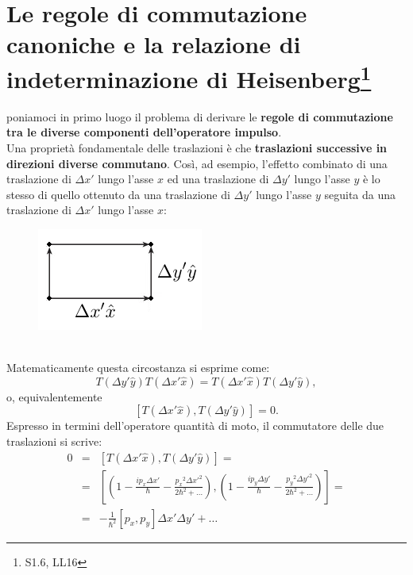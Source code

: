 \documentclass[a4paper,12pt,oneside]{book}
\begin{document}
\section[Le regole di commutazione canoniche e la relazione di indeterminazione di Heisenberg]{Le regole di commutazione canoniche e la relazione di indeterminazione di Heisenberg\footnote{S1.6, LL16}}
poniamoci in primo luogo il problema di derivare le \textbf{regole di commutazione tra le diverse componenti dell'operatore impulso}.\\
Una proprietà fondamentale delle traslazioni è che \textbf{traslazioni successive in direzioni diverse commutano}. Così, ad esempio, l'effetto combinato di una traslazione di $\Delta x'$ lungo l'asse $x$ ed una traslazione di $\Delta y'$ lungo l'asse $y$ è lo stesso di quello ottenuto da una traslazione di $\Delta y'$ lungo l'asse $y$ seguita da una traslazione di $\Delta x'$ lungo l'asse $x$:\\
\begin{figure}[!htbp]
\begin{center}
\includegraphics[scale=.8]{immagini/cap_7/fig7_1.png}
\end{center}
\end{figure}\\
Matematicamente questa circostanza si esprime come:
\begin{equation}
T(\Delta y'\hat{y})T(\Delta x'\hat{x})= T(\Delta x'\hat{x})T(\Delta y'\hat{y}),
\end{equation}
o, equivalentemente
\begin{equation}
\left[ T(\Delta x'\hat{x}), T(\Delta y'\hat{y})\right] =0.
\end{equation}
Espresso in termini dell'operatore quantità di moto, il commutatore delle due traslazioni si scrive:
\begin{eqnarray}
0 & = & \left[ T(\Delta x'\hat{x}), T(\Delta y'\hat{y})\right] =   \nonumber \\
 & = & \left[\left( 1-\frac{i p_x \Delta x'}{\hbar}-\frac{ {p_x} ^2 {\Delta x'}^2}{2\hbar ^2+\dots}\right), \left( 1-\frac{i p_y \Delta y'}{\hbar}-\frac{ {p_y} ^2 {\Delta y'}^2}{2\hbar ^2+\dots}\right) \right] = \nonumber  \\
& = & -\frac{1}{\hbar ^2}\left[p_x, p_y \right]\Delta x' \Delta y' + \dots
\end{eqnarray}
\end{document}
